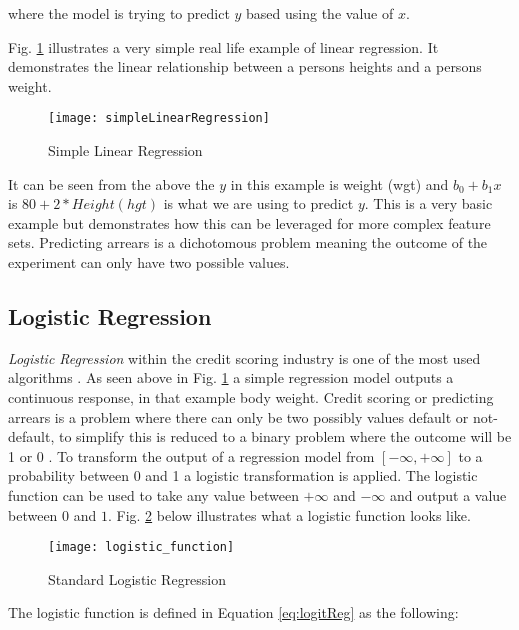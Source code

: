 where the model is trying to predict $y$ based using the value of $x$.

Fig. \ref{fig:simpleLinearRegression} illustrates a very simple real life example of linear regression. It demonstrates the linear relationship between a persons heights and a persons weight.

\begin{figure}[H]
	\texttt{[image: simpleLinearRegression]}
	\caption[Confusion Matrix]
	{Simple Linear Regression}
	\label{fig:simpleLinearRegression}
\end{figure}

It can be seen from the above the $y$ in this example is weight (wgt) and $b_0 + b_1x$ is $80 + 2*Height(hgt)$ is what we are using to predict $y$. This is a very basic example but demonstrates how this can be leveraged for more complex feature sets. Predicting arrears is a dichotomous problem meaning the outcome of the experiment can only have two possible values. 

\subsection{Logistic Regression} \label{LogReg}
\textit{Logistic Regression} \cite[See:][]{hosmer_applied_2000} within the credit scoring industry is one of the most used algorithms \citep{hand_evaluating_2010}. As seen above in Fig. \ref{fig:simpleLinearRegression} a simple regression model outputs a continuous response, in that example body weight. Credit scoring or predicting arrears is a problem where there can only be two possibly values default or not-default, to simplify this is reduced to a binary problem where the outcome will be 1 or 0 \citep{zou_modified_2004}. To transform the output of a regression model from $[-\infty, +\infty]$ to a probability between 0 and 1 a logistic transformation is applied. The logistic function can be used to take any value between $+\infty$ and $-\infty$ and output a value between $0$ and $1$. Fig. \ref{fig:logistic_function} below illustrates what a logistic function looks like.


\begin{figure}[H]
	\texttt{[image: logistic\_function]}
	\caption[Standard Logistic Regression]
	{Standard Logistic Regression}
	\label{fig:logistic_function}
\end{figure}

The logistic function is defined in Equation \ref{eq:logitReg} as the following: 

